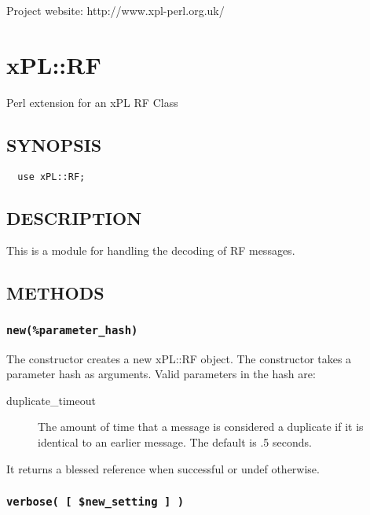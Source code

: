 Project website: http://www.xpl-perl.org.uk/

\section{xPL::RF\label{xPL::RF}}


Perl extension for an xPL RF Class

\subsection*{SYNOPSIS\label{xPL::RF_SYNOPSIS}}
\begin{verbatim}
  use xPL::RF;
\end{verbatim}
\subsection*{DESCRIPTION\label{xPL::RF_DESCRIPTION}}


This is a module for handling the decoding of RF messages.

\subsection*{METHODS\label{xPL::RF_METHODS}}
\subsubsection*{\texttt{new(\%parameter\_hash)}\label{xPL::RF_new_parameter_hash_}}


The constructor creates a new xPL::RF object.  The constructor takes a
parameter hash as arguments.  Valid parameters in the hash are:

\begin{description}

\item[{duplicate\_timeout}] \mbox{}

The amount of time that a message is considered a duplicate if it
is identical to an earlier message.  The default is .5 seconds.

\end{description}


It returns a blessed reference when successful or undef otherwise.

\subsubsection*{\texttt{verbose( [ \$new\_setting ] )}\label{xPL::RF_verbose_new_setting_}}


